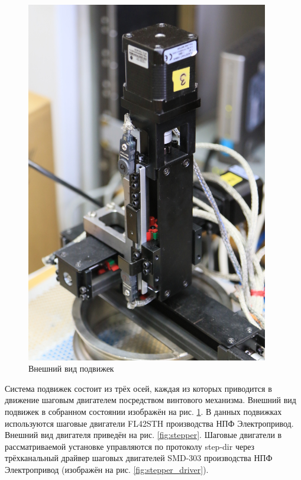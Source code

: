 \documentclass[14pt,russian,a4paper]{extarticle}
\newcommand{\gb}[1]{\guillemotleft #1\guillemotright}
\begin{document}
\begin{figure}[h!]
    \centerline{\includegraphics[width=300pt]{media/axes.jpg}}
    \caption{Внешний вид подвижек}
    \label{fig:axes}
\end{figure}

Система подвижек состоит из трёх осей, каждая из которых приводится в движение шаговым двигателем посредством винтового механизма. Внешний вид подвижек в собранном состоянии изображён на рис. \ref{fig:axes}. В данных подвижках используются шаговые двигатели FL42STH производства НПФ Электропривод\cite{stepper}. Внешний вид двигателя приведён на рис. \ref{fig:stepper}.
\newline
Шаговые двигатели в рассматриваемой установке управляются по протоколу \gb{step-dir} через трёхканальный драйвер шаговых двигателей SMD-303 производства НПФ Электропривод \cite{stepper_driver} (изображён на рис. \ref{fig:stepper_driver}).
\newline
\end{document}
